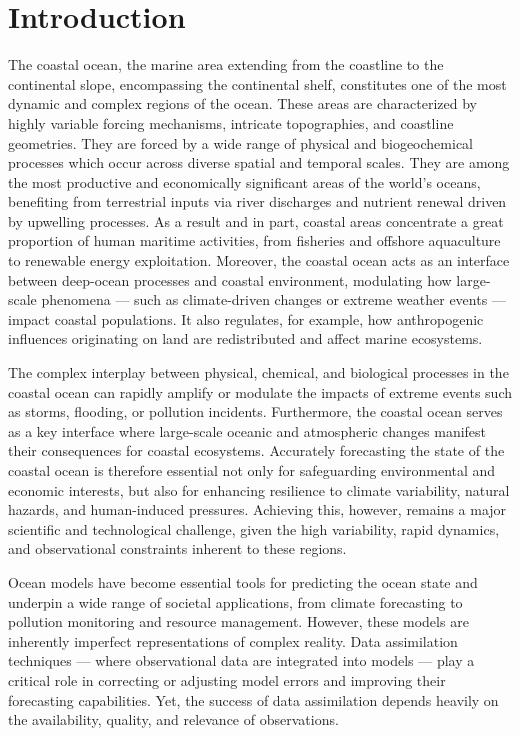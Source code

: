 \section{Introduction}
\label{sec:intro}

The coastal ocean, the marine area extending from the coastline to the
continental slope, encompassing the continental shelf, constitutes one
of the most dynamic and complex regions of the ocean. These areas are
characterized by highly variable forcing mechanisms, intricate
topographies, and coastline geometries. They are forced by a wide
range of physical and biogeochemical processes which occur across
diverse spatial and temporal scales. They are among the most
productive and economically significant areas of the world’s oceans,
benefiting from terrestrial inputs via river discharges and nutrient
renewal driven by upwelling processes. As a result and in part,
coastal areas concentrate a great proportion of human maritime
activities, from fisheries and offshore aquaculture to renewable
energy exploitation. Moreover, the coastal ocean acts as an interface
between deep-ocean processes and coastal environment, modulating how
large-scale phenomena — such as climate-driven changes or extreme
weather events — impact coastal populations. It also regulates, for
example, how anthropogenic influences originating on land are
redistributed and affect marine ecosystems.

The complex interplay between physical, chemical, and biological
processes in the coastal ocean can rapidly amplify or modulate the
impacts of extreme events such as storms, flooding, or pollution
incidents. Furthermore, the coastal ocean serves as a key interface
where large-scale oceanic and atmospheric changes manifest their
consequences for coastal ecosystems. Accurately forecasting the state
of the coastal ocean is therefore essential not only for safeguarding
environmental and economic interests, but also for enhancing
resilience to climate variability, natural hazards, and human-induced
pressures.  Achieving this, however, remains a major scientific and
technological challenge, given the high variability, rapid dynamics,
and observational constraints inherent to these regions.

Ocean models have become essential tools for predicting the ocean
state and underpin a wide range of societal applications, from climate
forecasting to pollution monitoring and resource management. However,
these models are inherently imperfect representations of complex
reality. Data assimilation techniques — where observational data are
integrated into models — play a critical role in correcting or
adjusting model errors and improving their forecasting
capabilities. Yet, the success of data assimilation depends heavily on
the availability, quality, and relevance of observations.

